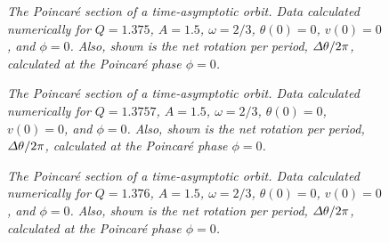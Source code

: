 \begin{figure}
\centerline{}
\caption{\em The Poincar\'{e} section of a time-asymptotic orbit.
Data calculated numerically  for $Q=1.375$, $A=1.5$, $\omega=2/3$,
$\theta(0)=0$, $v(0)=0$, and $\phi=0$. Also, shown is the
net rotation per period, ${\mit\Delta}\theta/2\pi$, calculated at the Poincar\'{e} phase
$\phi=0$.}\label{f37}
\end{figure}

\begin{figure}
\centerline{}
\caption{\em The Poincar\'{e} section of a time-asymptotic orbit. Data
calculated numerically for $Q=1.3757$, $A=1.5$, $\omega=2/3$,
$\theta(0)=0$, $v(0)=0$, and $\phi=0$. Also, shown is the
net rotation per period, ${\mit\Delta}\theta/2\pi$, calculated at the Poincar\'{e} phase
$\phi=0$.}\label{f38}
\end{figure}

\begin{figure}
\centerline{}
\caption{\em The Poincar\'{e} section of a time-asymptotic orbit. Data
calculated numerically for $Q=1.376$, $A=1.5$, $\omega=2/3$,
$\theta(0)=0$, $v(0)=0$, and $\phi=0$. Also, shown is the
net rotation per period, ${\mit\Delta}\theta/2\pi$, calculated at the Poincar\'{e} phase
$\phi=0$.}\label{f39}
\end{figure}

